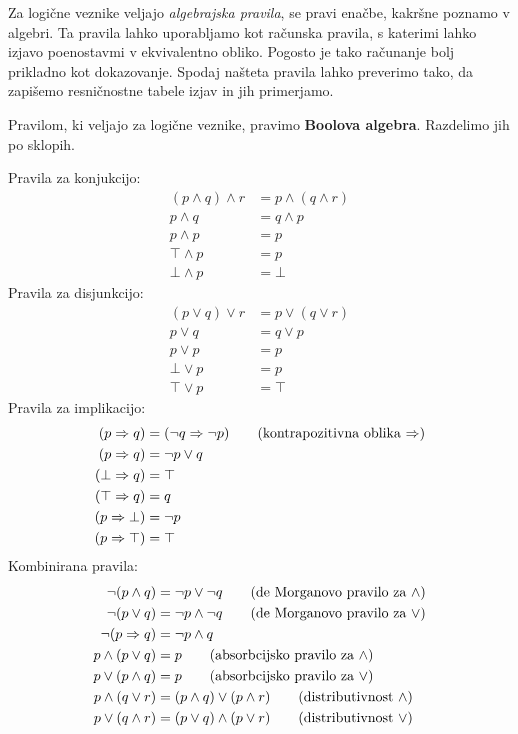 Za logične veznike veljajo \emph{algebrajska pravila}, se pravi enačbe, kakršne poznamo v algebri. Ta pravila lahko uporabljamo kot računska pravila, s katerimi lahko izjavo poenostavmi v ekvivalentno obliko. Pogosto je tako računanje bolj prikladno kot dokazovanje. Spodaj našteta pravila lahko preverimo tako, da zapišemo resničnostne tabele izjav in jih primerjamo.

Pravilom, ki veljajo za logične veznike, pravimo \textbf{Boolova algebra}.
Razdelimo jih po sklopih.

Pravila za konjukcijo:
%
\begin{align}
  (p \land q) \land r &= p \land (q \land r) \tag{asociativnost $\land$} \\
  p \land q &= q \land p \tag{komutativnost $\land$} \\
  p \land p &= p \tag{idempotentnost $\land$} \\
  \top \land p &= p \tag{$\top$ je nevtralen za $\land$} \\
  \bot \land p &= \bot \tag{$\bot$ absorbira $\land$}
\end{align}
%
Pravila za disjunkcijo:
%
\begin{align}
  (p \lor q) \lor r &= p \lor (q \lor r) \tag{asociativnost $\lor$} \\
  p \lor q &= q \lor p \tag{komutativnost $\lor$} \\
  p \lor p &= p \tag{idempotentnost $\lor$} \\
  \bot \lor p &= p \tag{$\bot$ je nevtralen za $\lor$} \\
  \top \lor p &= \top \tag{$\top$ absorbira $\lor$}
\end{align}
%
Pravila za implikacijo:
%
\begin{align}
  (p \lthen q) &= (\neg q \lthen \neg p) \tag{kontrapozitivna oblika $\lthen$}\\
  (p \lthen q) &= \neg p \lor q \notag \\
  (\bot \lthen q) &= \top \notag \\
  (\top \lthen q) &= q \notag \\
  (p \lthen \bot) &= \neg p \notag \\
  (p \lthen \top) &= \top \notag
\end{align}
%
Kombinirana pravila:
%
\begin{align}
  \neg(p \land q) &= \neg p \lor \neg q \tag{de Morganovo pravilo za $\land$} \\
  \neg(p \lor q) &= \neg p \land \neg q \tag{de Morganovo pravilo za $\lor$} \\
  \neg(p \Rightarrow q) &= \neg p \land q \notag \\
  p \land (p \lor q) &= p \tag{absorbcijsko pravilo za $\land$}\\
  p \lor (p \land q) &= p \tag{absorbcijsko pravilo za $\lor$} \\
  p \land (q \lor r) &= (p \land q) \lor (p \land r) \tag{distributivnost $\land$}\\
  p \lor (q \land r) &= (p \lor q) \land (p \lor r) \tag{distributivnost $\lor$}
\end{align}
